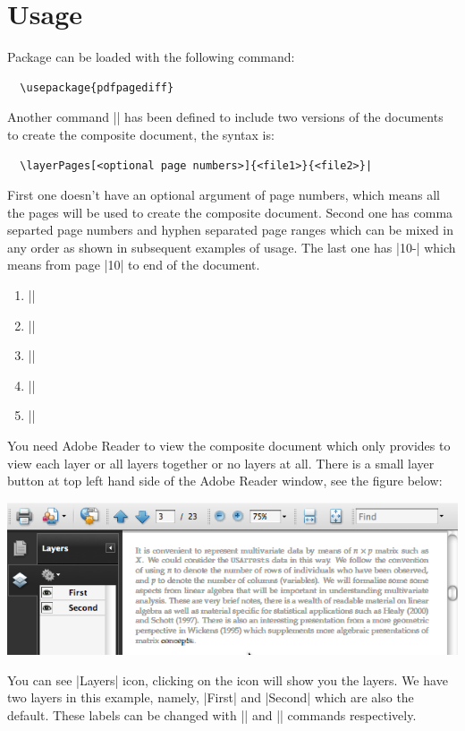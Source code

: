 \documentclass[a4paper]{article}
\begin{document}
\section{Usage}

Package can be loaded with the following command:
\begin{verbatim}
  \usepackage{pdfpagediff}
\end{verbatim}
Another command |\layerPages| has been defined to include two versions
of the \pdf documents to create the composite document, the syntax is:
\begin{verbatim}
  \layerPages[<optional page numbers>]{<file1>}{<file2>}|
\end{verbatim}
First one doesn't have an optional argument of page numbers, which
means all the pages will be used to create the composite document.
Second one has comma separted page numbers and hyphen separated page
ranges which can be mixed in any order as shown in subsequent examples
of usage. The last one has |10-| which means from page |10| to end
of the document.

\begin{enumerate}
\item ||
\item ||
\item ||
\item ||
\item ||
\end{enumerate}
You need Adobe Reader to view the composite document which only
provides to view each layer or all layers together or no layers at
all.  There is a small layer button at top left hand side of the
Adobe Reader window, see the figure below:

\medskip
\noindent\includegraphics[width=\linewidth]{ar1}

\medskip\noindent
You can see |Layers| icon, clicking on the icon will show you the
layers.  We have two layers in this example, namely, |First| and
|Second| which are also the default.  These labels can be changed with
|\FirstDoc| and |\SecondDoc| commands respectively. 
\end{document}
